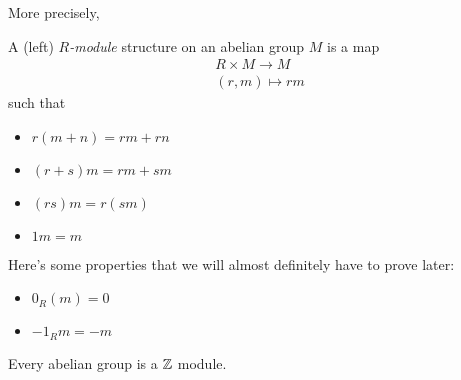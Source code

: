 \documentclass[12pt, twosided]{article}
\begin{document}
More precisely,

\begin{df}
  A (left) \textit{\(R\)-module} structure on an abelian group \(M\) is a map
  \begin{align*}
    R \times M \to M \\
    (r,m) \mapsto rm
  \end{align*}
  such that
  \begin{itemize}
  \item \(r(m + n) = rm + rn\) 
  \item \((r + s)m = rm + sm\)
  \item \((rs)m = r(sm)\)
  \item \(1m = m\)
  \end{itemize}
\end{df}

Here's some properties that we will almost definitely have to prove later:

\begin{itemize}
\item \(0_R(m) = 0\)
\item \(-1_Rm = -m\)
\end{itemize}

\begin{exa}
  Every abelian group is a \(\mathbb{Z}\) module.
\end{exa}
\end{document}
